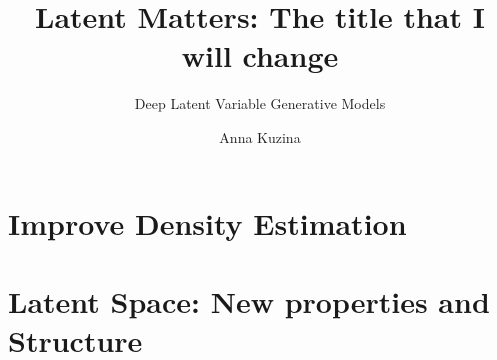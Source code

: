\documentclass[nobib,justified,titlepage,nofonts,a4paper]{tufte-book}
\author[Anna Kuzina]{Anna Kuzina}
\title{Latent Matters: The title that I will change}
\subtitle{Deep Latent Variable Generative Models}
\begin{document}
\frontmatter
\maketitlepage
\pagestyle{plain}

% 
\tableofcontents


\mainmatter


% 

\listoftodos[Notes]

\part{Improve Density Estimation} \label{part:1}



% 

\part{Latent Space: New properties and Structure}\label{part:2}


% 



% 

% 




\end{document}
